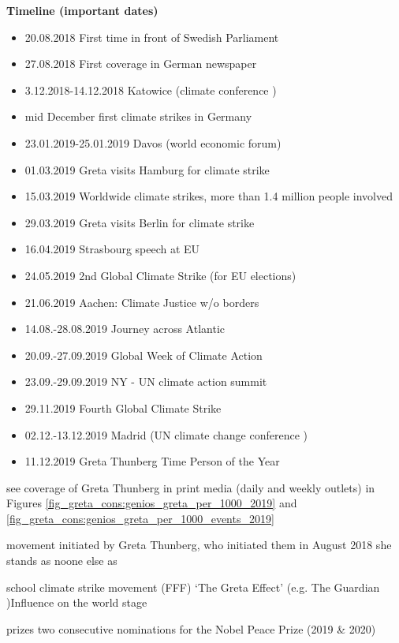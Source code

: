 \documentclass[11pt, a4paper]{article} %
\begin{document}
\textbf{Timeline (important dates)}
\begin{itemize}
	\item 20.08.2018 First time in front of Swedish Parliament
	\item 27.08.2018 First coverage in German newspaper
	\item 3.12.2018-14.12.2018 Katowice (climate conference )
	\item mid December first climate strikes in Germany
	\item 23.01.2019-25.01.2019 Davos (world economic forum)
	\item 01.03.2019 Greta visits Hamburg for climate strike
	\item 15.03.2019 Worldwide climate strikes, more than 1.4 million people involved
	\item 29.03.2019 Greta visits Berlin for climate strike
	\item 16.04.2019 Strasbourg speech at EU
	\item 24.05.2019 2nd Global Climate Strike (for EU elections)
	\item 21.06.2019 Aachen: Climate Justice w/o borders
	\item 14.08.-28.08.2019 Journey across Atlantic 
	\item 20.09.-27.09.2019 Global Week of Climate Action
	\item 23.09.-29.09.2019 NY - UN climate action summit
	\item 29.11.2019 Fourth Global Climate Strike
	\item 02.12.-13.12.2019 Madrid (UN climate change conference )
	\item 11.12.2019 Greta Thunberg Time Person of the Year	
\end{itemize}
see coverage of Greta Thunberg in print media (daily and weekly outlets) in Figures \ref{fig_greta_cons:genios_greta_per_1000_2019} and \ref{fig_greta_cons:genios_greta_per_1000_events_2019}





movement initiated by Greta Thunberg, who initiated them in August 2018
she stands as noone else as 

school climate strike movement (FFF)
`The Greta Effect' (e.g. The Guardian )Influence on the world stage

prizes 
two consecutive nominations for the Nobel Peace Prize (2019 \& 2020)
\end{document}
